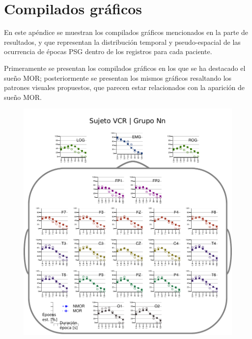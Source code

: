 
\chapter{Compilados gráficos}

En este apéndice se muestran los compilados gráficos mencionados en la parte de resultados,
y que representan la
distribución temporal y pseudo-espacial de las ocurrencia de épocas PSG dentro de los registros 
para cada paciente. 

Primeramente se presentan los compilados gráficos en los que se ha destacado el sueño MOR;
posteriormente se presentan los mismos gráficos resaltando los patrones visuales
propuestos, que parecen estar relacionados con la aparición de sueño MOR.


\begin{figure}
\centering
\includegraphics[width=.9\linewidth]{./img_resultados/cabeza_VCR.pdf}
\end{figure}

